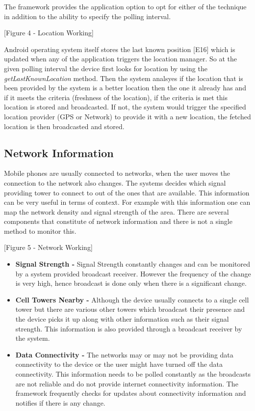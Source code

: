\documentclass[12pt]{report}
\begin{document}
The framework provides the application option to opt for either of the technique in addition to the ability to specify the polling interval.

[Figure 4 - Location Working]

Android operating system itself stores the last known position [E16] which is updated when any of the application triggers the location manager. So at the given polling interval the device first looks for location by using the \textit{getLastKnownLocation} method. Then the system analsyes if the location that is been provided by the system is a better location then the one it already has and if it meets the criteria (freshness of the location), if the criteria is met this location is stored and broadcasted. If not, the system would trigger the specified location provider (GPS or Network) to provide it with a new location, the fetched location is then broadcasted and stored.

\subsection{Network Information}
Mobile phones are usually connected to networks, when the user moves the connection to the network also changes. The systems decides which signal providing tower to connect to out of the ones that are available. This information can be very useful in terms of context. For example with this information one can map the network density and signal strength of the area. There are several components that constitute of network information and there is not a single method to monitor this.

[Figure 5 - Network Working]

\begin{itemize}
\item \textbf{Signal Strength - } Signal Strength constantly changes and can be monitored by a system provided broadcast receiver. However the frequency of the change is very high, hence broadcast is done only when there is a significant change.

\item \textbf{Cell Towers Nearby - } Although the device usually connects to a single cell tower but there are various other towers which broadcast their presence and the device picks it up along with other information such as their signal strength. This information is also provided through a broadcast receiver by the system.

\item \textbf{Data Connectivity - } The networks may or may not be providing data connectivity to the device or the user might have turned off the data connectivity. This information needs to be polled constantly as the broadcasts are not reliable and do not provide internet connectivity information. The framework frequently checks for updates about connectivity information and notifies if there is any change.

\end{itemize}
\end{document}

